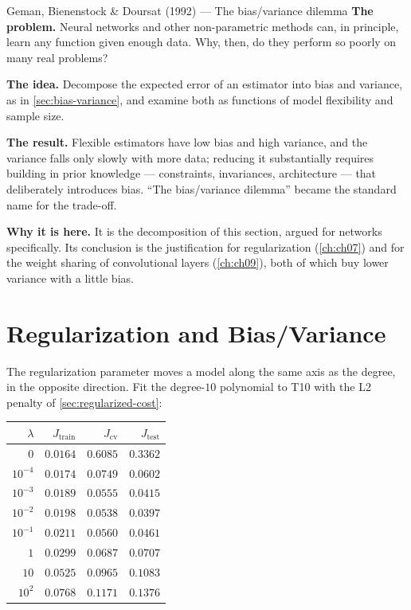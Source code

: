 \begin{researchspotlight}{Geman, Bienenstock \& Doursat (1992) --- The bias/variance dilemma}
\textbf{The problem.} Neural networks and other non-parametric methods can, in
principle, learn any function given enough data. Why, then, do they perform so
poorly on many real problems?

\textbf{The idea.} Decompose the expected error of an estimator into bias and
variance, as in \cref{sec:bias-variance}, and examine both as functions of model
flexibility and sample size.

\textbf{The result.} Flexible estimators have low bias and high variance, and the
variance falls only slowly with more data; reducing it substantially requires
building in prior knowledge --- constraints, invariances, architecture --- that
deliberately introduces bias. ``The bias/variance dilemma'' became the standard
name for the trade-off.

\textbf{Why it is here.} It is the decomposition of this section, argued for
networks specifically. Its conclusion is the justification for regularization
(\cref{ch:ch07}) and for the weight sharing of convolutional layers
(\cref{ch:ch09}), both of which buy lower variance with a little bias.
\parencite{geman1992}
\end{researchspotlight}

\section{Regularization and Bias/Variance}
\label{sec:reg-bv}

The regularization parameter moves a model along the same axis as the degree,
in the opposite direction. Fit the degree-$10$ polynomial to T10 with the L2
penalty of \cref{sec:regularized-cost}:

\begin{center}
\small
\renewcommand{\arraystretch}{1.15}
\begin{tabular}{@{}rrrr@{}}
\toprule
$\lambda$ & $J_{\text{train}}$ & $J_{\text{cv}}$ & $J_{\text{test}}$\\
\midrule
$0$         & $0.0164$ & $0.6085$ & $0.3362$\\
$10^{-4}$   & $0.0174$ & $0.0749$ & $0.0602$\\
$10^{-3}$   & $0.0189$ & $0.0555$ & $0.0415$\\
$10^{-2}$   & $0.0198$ & $\mathbf{0.0538}$ & $0.0397$\\
$10^{-1}$   & $0.0211$ & $0.0560$ & $0.0461$\\
$1$         & $0.0299$ & $0.0687$ & $0.0707$\\
$10$        & $0.0525$ & $0.0965$ & $0.1083$\\
$10^{2}$    & $0.0768$ & $0.1171$ & $0.1376$\\
\bottomrule
\end{tabular}
\end{center}

